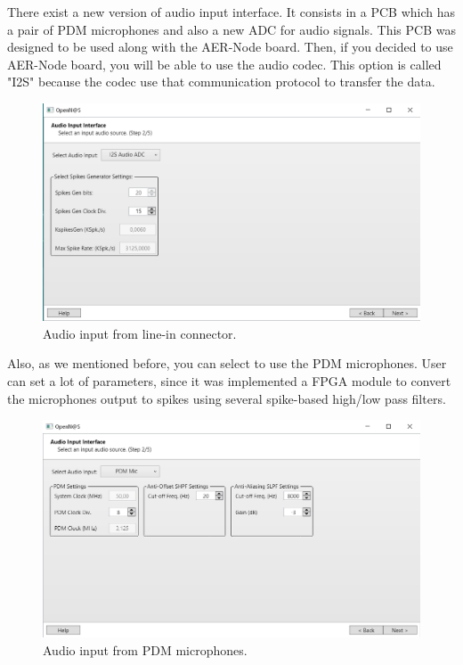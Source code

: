 There exist a new version of audio input interface. It consists in a PCB which has a pair of PDM microphones and also a new ADC for audio signals. This PCB was designed to be used along with the AER-Node board. Then, if you decided to use AER-Node board, you will be able to use the audio codec. This option is called "I2S" because the codec use that communication protocol to transfer the data.

\begin{figure}[H]
\centering
\includegraphics[width=1\textwidth]{images/Img17_S2_SelectInput_2.PNG}
\caption{\label{fig:OpenNAS_s2_i2s}Audio input from line-in connector.}
\end{figure}

Also, as we mentioned before, you can select to use the PDM microphones. User can set a lot of parameters, since it was implemented a FPGA module to convert the microphones output to spikes using several spike-based high/low pass filters.

\begin{figure}[H]
\centering
\includegraphics[width=1\textwidth]{images/Img18_S2_SelectInput_3.PNG}
\caption{\label{fig:OpenNAS_s2_pdm}Audio input from PDM microphones.}
\end{figure}

